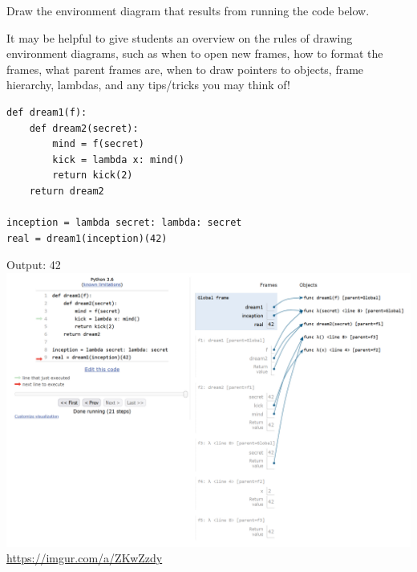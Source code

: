 \begin{blocksection}
\question Draw the environment diagram that results from running the code below.

\begin{questionmeta}
    It may be helpful to give students an overview on the rules of drawing environment diagrams, such as when to open new frames, how to format the frames, what parent frames are, when to draw pointers to objects, frame hierarchy, lambdas, and any tips/tricks you may think of!
\end{questionmeta}

\begin{lstlisting}
def dream1(f):
    def dream2(secret):
        mind = f(secret)
        kick = lambda x: mind()
        return kick(2)
    return dream2

inception = lambda secret: lambda: secret
real = dream1(inception)(42)
\end{lstlisting}

\pagebreak

\begin{solution}[2in]
Output: 42 \newline
\includegraphics[scale=0.5]{newNewInception.png}
\newline
\url{https://imgur.com/a/ZKwZzdy}
\end{solution}
\end{blocksection}

